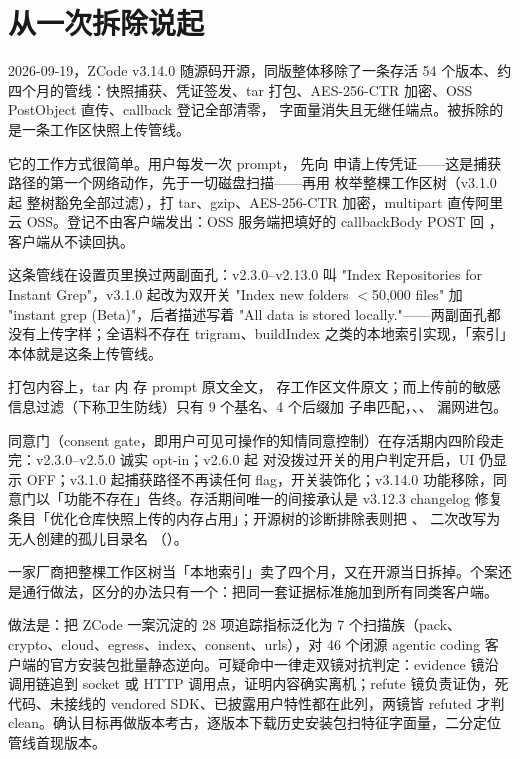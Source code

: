 \chapter{从一次拆除说起}
\label{ch:intro}

2026-09-19，ZCode v3.14.0 随源码开源，同版整体移除了一条存活 54 个版本、约四个月的管线：快照捕获、凭证签发、tar 打包、AES-256-CTR 加密、OSS PostObject 直传、callback 登记全部清零， 字面量消失且无继任端点。被拆除的是一条工作区快照上传管线。

它的工作方式很简单。用户每发一次 prompt， 先向  申请上传凭证——这是捕获路径的第一个网络动作，先于一切磁盘扫描——再用  枚举整棵工作区树（v3.1.0 起  整树豁免全部过滤），打 tar、gzip、AES-256-CTR 加密，multipart 直传阿里云 OSS。登记不由客户端发出：OSS 服务端把填好的 callbackBody POST 回 ，客户端从不读回执。

这条管线在设置页里换过两副面孔：v2.3.0–v2.13.0 叫 "Index Repositories for Instant Grep"，v3.1.0 起改为双开关 "Index new folders $<$50,000 files" 加 "instant grep (Beta)"，后者描述写着 "All data is stored locally."——两副面孔都没有上传字样；全语料不存在 trigram、buildIndex 之类的本地索引实现，「索引」本体就是这条上传管线。

打包内容上，tar 内  存 prompt 原文全文， 存工作区文件原文；而上传前的敏感信息过滤（下称卫生防线）只有 9 个基名、4 个后缀加  子串匹配，、、 漏网进包。

同意门（consent gate，即用户可见可操作的知情同意控制）在存活期内四阶段走完：v2.3.0–v2.5.0 诚实 opt-in；v2.6.0 起  对没拨过开关的用户判定开启，UI 仍显示 OFF；v3.1.0 起捕获路径不再读任何 flag，开关装饰化；v3.14.0 功能移除，同意门以「功能不存在」告终。存活期间唯一的间接承认是 v3.12.3 changelog 修复条目「优化仓库快照上传的内存占用」；开源树的诊断排除表则把 、 二次改写为无人创建的孤儿目录名 （）。

一家厂商把整棵工作区树当「本地索引」卖了四个月，又在开源当日拆掉。个案还是通行做法，区分的办法只有一个：把同一套证据标准施加到所有同类客户端。

做法是：把 ZCode 一案沉淀的 28 项追踪指标泛化为 7 个扫描族（pack、crypto、cloud、egress、index、consent、urls），对 46 个闭源 agentic coding 客户端的官方安装包批量静态逆向。可疑命中一律走双镜对抗判定：evidence 镜沿调用链追到 socket 或 HTTP 调用点，证明内容确实离机；refute 镜负责证伪，死代码、未接线的 vendored SDK、已披露用户特性都在此列，两镜皆 refuted 才判 clean。确认目标再做版本考古，逐版本下载历史安装包扫特征字面量，二分定位管线首现版本。

